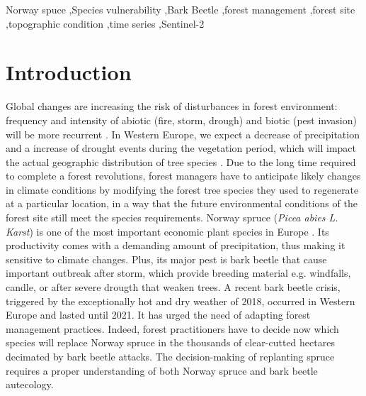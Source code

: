 \documentclass[3p,procedia]{elsarticle}
\begin{document}
\begin{frontmatter}
\begin{abstract}
\fi
\end{abstract}

\begin{keyword}
  Norway spuce \sep Species vulnerability \sep Bark Beetle \sep forest management \sep forest site \sep topographic condition \sep time series \sep Sentinel-2
\end{keyword}

\end{frontmatter}

\linenumbers

\section{Introduction}

Global changes are increasing the risk of disturbances in forest environment: frequency and intensity of abiotic (fire, storm, drough) and biotic (pest invasion) will be more recurrent \citep{lindner_climate_2010}.
In Western Europe, we expect a decrease of precipitation and a increase of drought events during the vegetation period, which will impact the actual geographic distribution of tree species \citep{hanewinkel2013climate}.
Due to the long time required to complete a forest revolutions, forest managers have to anticipate likely changes in climate conditions by modifying the forest tree species they used to regenerate at a particular location, in a way that the future environmental conditions of the forest site still meet the species requirements.
Norway spruce (\textit{Picea abies L. Karst}) is one of the most important economic plant species in Europe \citep{nystedt_norway_2013}.
Its productivity comes with a demanding amount of precipitation, thus making it sensitive to climate changes.
Plus, its major pest is bark beetle that cause important outbreak after storm, which provide breeding material e.g. windfalls, candle, or after severe drougth that weaken trees.
A recent bark beetle crisis, triggered by the exceptionally hot and dry weather of 2018, occurred in Western Europe and lasted until 2021. 
It has urged the need of adapting forest management practices. 
Indeed, forest practitioners have to decide now which species will replace Norway spruce in the thousands of clear-cutted hectares decimated by bark beetle attacks. 
The decision-making of replanting spruce requires a proper understanding of both Norway spruce and bark beetle autecology.
\end{document}
